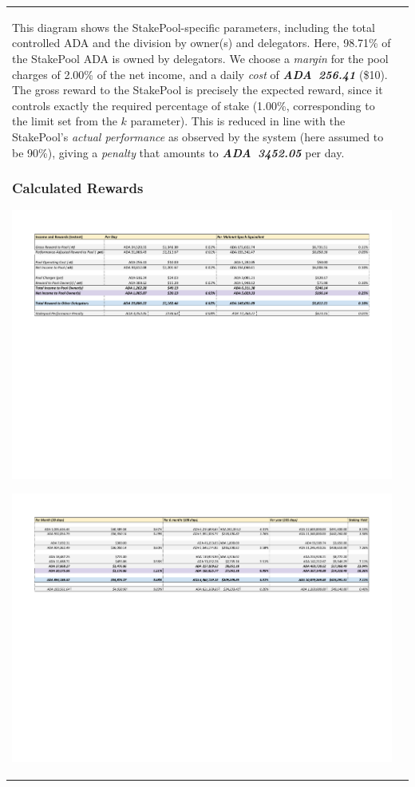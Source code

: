 \documentclass[11pt,a4paper,dvipsnames,twosided,final]{article}
\newcommand{\ada}{ADA{}}
\newcommand{\ADA}[1]{\textbf{\emph{\ada~{#1}}}}
\begin{document}
\begin{tabular}{||l|l||}
\noindent
This diagram shows the StakePool-specific parameters, including the total controlled \ada{} and the
division by owner(s) and delegators.  Here, 98.71\% of the StakePool \ada{} is owned
by delegators.  We choose a \emph{margin} for the pool charges of 2.00\% of the net income,
and a daily \emph{cost} of \ADA{256.41} (\$10).
The gross reward to the StakePool is precisely the expected reward, since it controls
exactly the required percentage of stake (1.00\%, corresponding to the limit set from
the $k$ parameter).  This is reduced in line with the StakePool's \emph{actual performance}
as observed by the system (here assumed to be 90\%), giving a \emph{penalty} that amounts
to \ADA{3452.05} per day.

\clearpage
\subsubsection*{Calculated Rewards}

\hspace{-0.65in}\begin{minipage}{\textwidth}
  \includegraphics[width=1.2\textwidth]{RCT4.pdf}
\vspace{-3.8in}

\includegraphics[width=1.2\textwidth]{RCT5.pdf}
\vspace{-3in}
\end{minipage}


\end{tabular}
\end{document}
